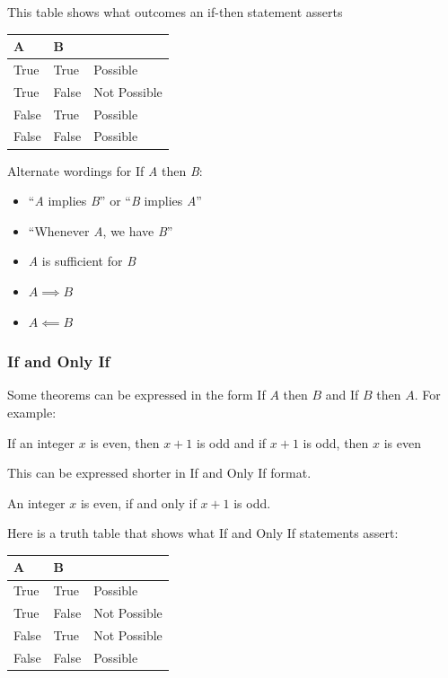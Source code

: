 \documentclass{article}
\theoremstyle{definition}
\theoremstyle{definition}
\begin{document}
\noindent This table shows what outcomes an if-then statement asserts


\begin{center}
\begin{tabular}{l|l||l}
    A & B & \\
    \hline
    True & True & Possible\\
    True & False & Not Possible\\
    False & True & Possible\\
    False & False & Possible\\
\end{tabular}
\end{center}

Alternate wordings for If \textit{A} then \textit{B}:
\begin{itemize}
    \item``\textit{A} implies \textit{B}'' or ``\textit{B}
        implies \textit{A}''
    \item ``Whenever \textit{A}, we have \textit{B}''
    \item \textit{A} is sufficient for \textit{B}
    \item $A \implies B$
    \item $A \impliedby B$
\end{itemize}
\subsubsection*{If and Only If}
Some theorems can be expressed in the form If $A$ then $B$ and If $B$ then $A$.
For example:
\begin{center}
    If an integer $x$ is even, then $x+1$ is odd and if $x+1$ is odd, then $x$ is even
\end{center}
This can be expressed shorter in If and Only If format.
\begin{center}
    An integer $x$ is even, if and only if $x+1$ is odd.
\end{center}

Here is a truth table that shows what If and Only If statements assert:

\begin{center}
\begin{tabular}{l|l||l}
    A & B & \\
    \hline
    True & True & Possible\\
    True & False & Not Possible\\
    False & True & Not Possible\\
    False & False & Possible\\

\end{tabular}
\end{center}
\end{document}
